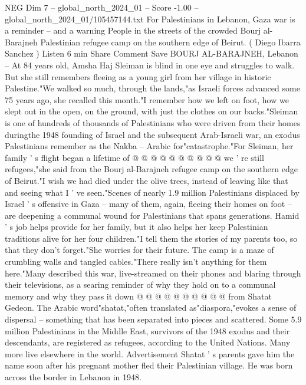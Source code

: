 \begin{textsample}{NEG Dim 7 – global\_north\_2024\_01 – Score -1.00 – global\_north\_2024\_01/105457144.txt}  \label{ex:f7_neg_260}
For Palestinians in Lebanon, Gaza war is a reminder -- and a warning People in the streets of the crowded Bourj al-Barajneh Palestinian refugee camp on the southern edge of Beirut. ( Diego Ibarra Sanchez ) Listen 6 min Share Comment Save BOURJ AL-BARAJNEH, Lebanon -- At 84 years old, Amsha Haj Sleiman is blind in one eye and struggles to walk.
But she still remembers fleeing as a young girl from her village in historic Palestine."We walked so much, through the lands,"as Israeli forces advanced some 75 years ago, she recalled this month."I remember how we left on foot, how we slept out in the open, on the ground, with just the clothes on our backs."Sleiman is one of hundreds of thousands of Palestinians who were driven from their homes duringthe 1948 founding of Israel and the subsequent Arab-Israeli war, an exodus Palestinians remember as the Nakba -- Arabic for"catastrophe."For Sleiman, her family ' s flight began a lifetime of @ @ @ @ @ @ @ @ @ @ we ' re still refugees,"she said from the Bourj al-Barajneh refugee camp on the southern edge of Beirut."I wish we had died under the olive trees, instead of leaving like that and seeing what I ' ve seen."Scenes of nearly 1.9 million Palestinians displaced by Israel ' s offensive in Gaza -- many of them, again, fleeing their homes on foot -- are deepening a communal wound for Palestinians that spans generations.
Hamid ' s job helps provide for her family, but it also helps her keep Palestinian traditions alive for her four children."I tell them the stories of my parents too, so that they don't forget."She worries for their future.
The camp is a maze of crumbling walls and tangled cables."There really isn't anything for them here."Many described this war, live-streamed on their phones and blaring through their televisions, as a searing reminder of why they hold on to a communal memory and why they pass it down @ @ @ @ @ @ @ @ @ @ from Shatat Gedeon.
The Arabic word"shatat,"often translated as"diaspora,"evokes a sense of dispersal -- something that has been separated into pieces and scattered.
Some 5.9 million Palestinians in the Middle East, survivors of the 1948 exodus and their descendants, are registered as refugees, according to the United Nations.
Many more live elsewhere in the world.
Advertisement Shatat ' s parents gave him the name soon after his pregnant mother fled their Palestinian village.
He was born across the border in Lebanon in 1948.

\end{textsample}
